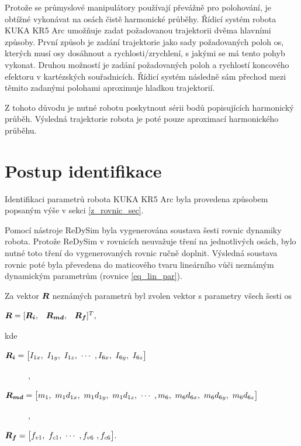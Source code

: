 Protože se průmyslové manipulátory používají převážně pro polohování, je obtížné vykonávat na osách čistě harmonické průběhy. Řídicí systém robota KUKA KR5 Arc umožňuje zadat požadovanou trajektorii dvěma hlavními způsoby. První způsob je zadání trajektorie jako sady požadovaných poloh os, kterých musí osy dosáhnout a rychlosti/zrychlení, s jakými se má tento pohyb vykonat. Druhou možností je zadání požadovaných poloh a rychlostí koncového efektoru v kartézských souřadnicích. Řídicí systém následně sám přechod mezi těmito zadanými polohami aproximuje hladkou trajektorií. 

Z tohoto důvodu je nutné robotu poskytnout sérii bodů popisujících harmonický průběh. Výsledná trajektorie robota je poté pouze aproximací harmonického průběhu.  

\section{Postup identifikace}

Identifikaci parametrů robota KUKA KR5 Arc byla provedena způsobem popsaným výše v sekci \ref{z_rovnic_sec}. 

Pomocí nástroje ReDySim byla vygenerována soustava šesti rovnic dynamiky robota. Protože ReDySim v rovnicích neuvažuje tření na jednotlivých osách, bylo nutné toto tření do vygenerovaných rovnic ručně doplnit. Výsledná soustava rovnic poté byla převedena do maticového tvaru lineárního vůči neznámým dynamickým parametrům (rovnice \eqref{eq_lin_par}). 

Za vektor $\boldsymbol{R}$ neznámých parametrů byl zvolen vektor s parametry všech šesti os

$\boldsymbol{R} = [\begin{matrix} \boldsymbol{R_i}, & \boldsymbol{R_{md}}, & \boldsymbol{R_f} \end{matrix}]^{T},$

kde 
\begin{description}
\item[$  \vect{R_i} = {\big[I_{1x}, \ I_{1y}, \ I_{1z}, \ \cdots \ , I_{6x}, \ I_{6y}, \ I_{6z}\big]}$], 
\item[$\vect{R_{md}} = {\big[m_1, \ m_1d_{1x}, \ m_1d_{1y}, \ m_1d_{1z}, \ \cdots \ , m_6, \ m_6d_{6x}, \ m_6d_{6y}, \ m_6d_{6z}\big]}$], 
\item[$\vect{R_f} = {\big[f_{v1}, \ f_{c1}, \ \cdots \ ,f_{v6} \ , f_{c6}\big]}.$] 
\end{description}

